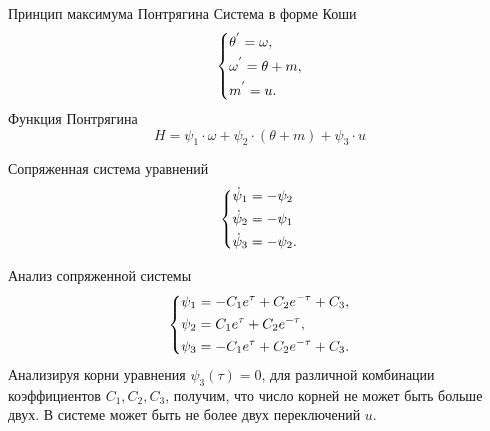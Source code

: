 \documentclass[10pt]{beamer}
\begin{document}
\begin{frame}{Принцип максимума Понтрягина}
	Система в форме Коши
	\begin{equation}\label{koshisystem}
		\left\{ {\begin{aligned}
					 & \theta^{'} = \omega , \hfill   \\
					 & \omega^{'} = \theta+m , \hfill \\
					 & m^{'} = u . \hfill             \\
				\end{aligned}} \right.
	\end{equation}
	Функция Понтрягина
	\[
		H=\psi_1\cdot\omega+\psi_2\cdot(\theta+m)+\psi_3\cdot u
	\]

	Сопряженная система уравнений
	\begin{equation} \label{7}
		\left\{ {\begin{aligned}
					 & \dot \psi _1  = - \psi_2\hfill  \\
					 & \dot \psi _2   = - \psi_1\hfill \\
					 & \dot \psi _3   = - \psi_2 . \hfill        \\
				\end{aligned}} \right.
	\end{equation}

\end{frame}

\begin{frame}{Анализ сопряженной системы}
	\begin{equation}\label{psisystem}
		\left\{ {\begin{aligned}
					 & \psi_1 = -C_1e^\tau+C_2e^{-\tau}+C_3, \hfill \\
					 & \psi_2 = C_1e^\tau+C_2e^{-\tau} , \hfill     \\
					 & \psi_3 = -C_1e^\tau+C_2e^{-\tau}+C_3 . \hfill     \\
				\end{aligned}} \right.
	\end{equation}
	Анализируя корни уравнения $\psi_3(\tau)=0$, для различной комбинации
	коэффициентов $C_1,C_2,C_3$, получим, что число корней не может быть больше двух. В системе может быть не более двух переключений $u$.
\end{frame}
\end{document}
